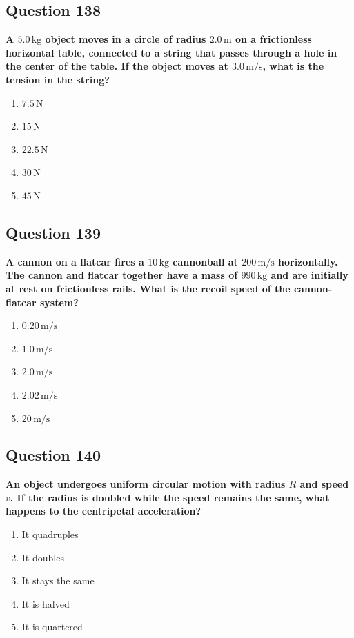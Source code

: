 \documentclass[12pt,letterpaper]{article}
\begin{document}
\subsection{Question 138}

\begin{questionbox}
\textbf{A $5.0\,\text{kg}$ object moves in a circle of radius $2.0\,\text{m}$ on a frictionless horizontal table, connected to a string that passes through a hole in the center of the table. If the object moves at $3.0\,\text{m/s}$, what is the tension in the string?}

\begin{enumerate}[label=\alph*)]
    \item $7.5\,\text{N}$
    \item $15\,\text{N}$
    \item $22.5\,\text{N}$
    \item $30\,\text{N}$
    \item $45\,\text{N}$
\end{enumerate}
\end{questionbox}

\subsection{Question 139}

\begin{questionbox}
\textbf{A cannon on a flatcar
fires a $10\,\text{kg}$ cannonball at $200\,\text{m/s}$ horizontally. The cannon and flatcar together have a mass of $990\,\text{kg}$ and are initially at rest on frictionless rails. What is the recoil speed of the cannon-flatcar system?}

\begin{enumerate}[label=\alph*)]
    \item $0.20\,\text{m/s}$
    \item $1.0\,\text{m/s}$
    \item $2.0\,\text{m/s}$
    \item $2.02\,\text{m/s}$
    \item $20\,\text{m/s}$
\end{enumerate}
\end{questionbox}

\subsection{Question 140}

\begin{questionbox}
\textbf{An object undergoes uniform circular motion with radius $R$ and speed $v$. If the radius is doubled while the speed remains the same, what happens to the centripetal acceleration?}

\begin{enumerate}[label=\alph*)]
    \item It quadruples
    \item It doubles
    \item It stays the same
    \item It is halved
    \item It is quartered
\end{enumerate}
\end{questionbox}
\end{document}
